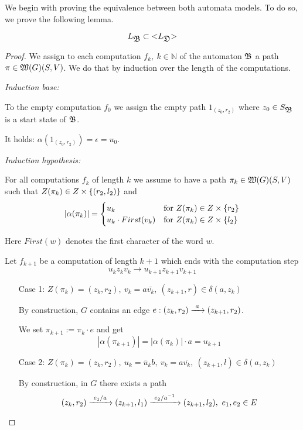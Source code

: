 \missingfigure

We begin with proving the equivalence between both automata models. To do so, we
prove the following lemma.

\begin{lemma}
\[ L_{\mbox{$\mathfrak{B}$}} \subset \mbox{${<}{L_{\mbox{$\mathfrak{D}$}}}{>}$} \]
\end{lemma}

\begin{proof}
We assign to each computation $f_k,\ k \in \mathbb{N}$ of the automaton $\mbox{$\mathfrak{B}$}$
a path $\pi \in \mbox{$\mathfrak{W}({G})$}(S, V)$. We do that by induction over the length of
the computations.

{\em Induction base:}

To the empty computation $f_0$ we assign the empty path $1_{(z_0, r_2)}$ where
$z_0 \in S_{\mbox{$\mathfrak{B}$}}$ is a start state of $\mbox{$\mathfrak{B}$}$.

It holds: $\alpha(1_{(z_0, r_2)}) = \epsilon = u_0$.

{\em Induction hypothesis:}

For all computations $f_k$ of length $k$ we assume to have a path $\pi_k \in
\mbox{$\mathfrak{W}({G})$}(S, V)$ such that $Z(\pi_k) \in Z \times \mbox{$\{(r_2, l_2)\}$}$ and
\[ |\alpha(\pi_k)| = \begin{cases}
u_k & \text{for }Z(\pi_k) \in Z \times \mbox{$\{r_2\}$} \\
u_k \cdot First(v_k) & \text{for }Z(\pi_k) \in Z \times \mbox{$\{l_2\}$}
\end{cases} \]

Here $First(w)$ denotes the first character of the word $w$.

Let $f_{k+1}$ be a computation of length $k+1$ which ends with the computation
step
\[ u_k z_k v_k \to u_{k+1} z_{k+1} v_{k+1} \]

\begin{itemize}
  \item[Case 1:] $Z(\pi_k) = (z_k, r_2),\ v_k = a \bar{v_k},\ (z_{k+1}, r) \in
  \delta(a, z_k)$
  
  By construction, $G$ contains an edge $e: (z_k, r_2) \xrightarrow{\ {a}\ } (z_{k+1}, r_2)$.
  
  We set $\pi_{k+1} := \pi_k \cdot e$ and get
  \[ |\alpha(\pi_{k+1})| = |\alpha(\pi_k)| \cdot a = u_{k+1} \]
  
  \item[Case 2:] $Z(\pi_k) = (z_k, r_2),\ u_k = \bar{u}_k b,\ v_k = a
  \bar{v_k},\ (z_{k+1}, l) \in \delta(a, z_k)$
  
  By construction, in $G$ there exists a path
  \[ (z_k, r_2) \xrightarrow{\ {e_1 / a}\ } (z_{k+1}, l_1) \xrightarrow{\ {e_2 / {{a}^{-1}}}\ } (z_{k+1},
  l_2),\ e_1, e_2 \in E \]
  

\end{itemize}
\end{proof}
